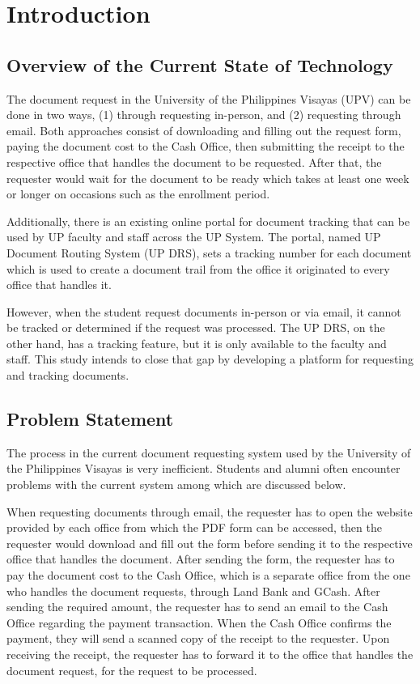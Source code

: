 \chapter{Introduction}
\label{sec:researchdesc}    %

\section{Overview of the Current State of Technology}
\label{sec:overview}

The document request in the University of the Philippines Visayas (UPV) can be done in two ways, (1) through requesting in-person, and (2) requesting through email. Both approaches consist of downloading and filling out the request form, paying the document cost to the Cash Office, then submitting the receipt to the respective office that handles the document to be requested. After that, the requester would wait for the document to be ready which takes at least one week or longer on occasions such as the enrollment period.

Additionally, there is an existing online portal for document tracking that can be used by UP faculty and staff across the UP System. The portal, named UP Document Routing System (UP DRS), sets a tracking number for each document which is used to create a document trail from the office it originated to every office that handles it.

However, when the student request documents in-person or via email, it cannot be tracked or determined if the request was processed. The UP DRS, on the other hand, has a tracking feature, but it is only available to the faculty and staff. This study intends to close that gap by developing a platform for requesting and tracking documents.

\section{Problem Statement}
The process in the current document requesting system used by the University of the Philippines Visayas is very inefficient. Students and alumni often encounter problems with the current system among which are discussed below.

When requesting documents through email, the requester has to open the website provided by each office from which the PDF form can be accessed, then the requester would download and fill out the form before sending it to the respective office that handles the document. After sending the form, the requester has to pay the document cost to the Cash Office, which is a separate office from the one who handles the document requests, through Land Bank and GCash. After sending the required amount, the requester has to send an email to the Cash Office regarding the payment transaction. When the Cash Office confirms the payment, they will send a scanned copy of the receipt to the requester. Upon receiving the receipt, the requester has to forward it to the office that handles the document request, for the request to be processed.

